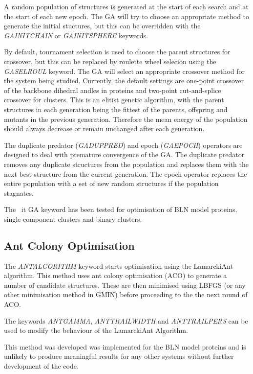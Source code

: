 \documentclass[12pt,a4paper,dvips]{article}
\begin{document}
A random population of structures is generated at the
start of each search and at the start of each new epoch. The GA will try to
choose an appropriate method to generate the initial stuctures, but this can be
overridden with the {\it GAINITCHAIN} or {\it GAINITSPHERE} keywords.

By default, tournament selection is used
to choose the parent structures for crossover, but this can be replaced by
roulette wheel selecion using the {\it GASELROUL} keyword. The GA will select an
appropriate crossover method for the system being studied. Currently, the default settings are one-point
crossover of the backbone dihedral andles in proteins and two-point
cut-and-splice crossover for clusters. This is an elitist genetic algorithm,
with the parent structures in each generation being the fittest of the parents, offspring and mutants in the
previous generation. Therefore the mean energy of the population should always
decrease or remain unchanged after each generation.

The duplicate predator ({\it GADUPPRED}) and epoch ({\it GAEPOCH}) operators are
designed to deal with premature convergence of the GA.  The duplicate predator
removes any duplicate structures from the population and replaces them with the
next best structure from the current generation. The epoch operator replaces the
entire population with a set of new random structures if the population
stagnates.

The {\ it GA} keyword has been tested for optimisation of BLN model proteins,
single-component clusters and binary clusters.

\subsection{Ant Colony Optimisation}
\label{sec:GA}
The {\it ANTALGORITHM} keyword starts optimisation using the LamarckiAnt
algorithm.\cite{Oakley2013Protein} This method uses ant colony optimisation (ACO)
to generate a number of candidate structures. These are then minimised using
LBFGS (or any other minimisation method in GMIN) before proceeding to the the
next round of ACO.

The keywords {\it ANTGAMMA}, {\it ANTTRAILWIDTH} and {\it ANTTRAILPERS}
can be used to modify the behaviour of the LamarckiAnt Algorithm.

This method was developed was implemented for the BLN model proteins and is
unlikely to produce meaningful results for any other systems without further
development of the code.
\end{document}
